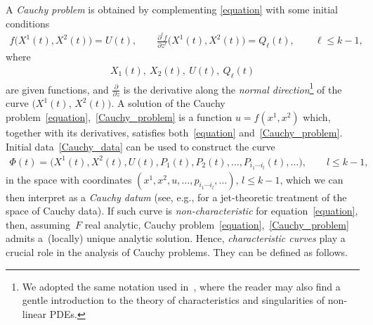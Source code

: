\documentclass[10pt,a4paper]{amsart}
\numberwithin{equation}{section}
\begin{document}
A \emph{Cauchy problem} is obtained by complementing \eqref{equation} with some
 initial conditions
\begin{gather}\label{Cauchy_problem}
f \big(X^{1}(t),X^{2}(t)\big) =U(t),\qquad
\frac{\partial^\ell f}{\partial z^{\ell}} \big(X^{1}(t),X^{2}(t)\big) =Q_{\ell}(t), \qquad \ell\leq k-1,
\end{gather}
where
\begin{gather}\label{Cauchy_data}
 X_1(t), \ X_2(t),\ U(t),\ Q_\ell(t)
\end{gather}
 are given functions, and $\frac{\partial}{\partial z}$ is the derivative along the \emph{normal direction}\footnote{We adopted the same notation used in~\cite{LucaChar}, where the reader may also f\/ind a gentle introduction to the theory of characteristics and singularities of non-linear PDEs.} of the curve $(X^1(t)$, $X^2(t))$. A solution of the Cauchy problem~\eqref{equation},~\eqref{Cauchy_problem} is a function $u=f(x^1,x^2)$ which, together with its derivatives, satisf\/ies both~\eqref{equation} and~\eqref{Cauchy_problem}.
Initial data~\eqref{Cauchy_data} can be used to construct the curve
\begin{gather}\label{Cauchy_datum}
\Phi(t)=\big(X^{1}(t),X^{2}(t),U(t),P_{1}(t),P_{2}(t),\dots,P_{i_1\cdots i_{l}}(t),\dots\big),\qquad l\leq k-1,
\end{gather}
in the space with coordinates $(x^1,x^2,u,\dots,p_{i_1\cdots i_l},\dots)$, $l\leq k-1$, which we can then interpret as a \emph{Cauchy datum} (see, e.g., \cite{MorenoCauchy} for a jet-theoretic treatment of the space of Cauchy data). If such curve is \emph{non-characteristic} for equation~\eqref{equation}, then, assuming~$F$ real analytic, Cauchy problem~\eqref{equation},~\eqref{Cauchy_problem} admits a~(locally) unique analytic solution. Hence, \emph{characteristic curves} play a crucial role in the analysis of Cauchy problems. They can be def\/ined as follows.
\end{document}
